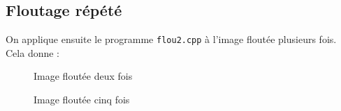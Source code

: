 \documentclass[french,a4paper,10pt]{article}
\begin{document}
    \newpage
    \subsection{Floutage répété}\label{subsec:4.2}

    On applique ensuite le programme \texttt{flou2.cpp} à l'image floutée plusieurs fois.
    Cela donne :
    \begin{figure}[!htb]
        \begin{minipage}{0.48\textwidth}
            \centering
            \caption{Image floutée deux fois}\label{Fig:peppers-grey-ff2-2}
        \end{minipage}\hfill
        \begin{minipage}{0.48\textwidth}
            \centering
            \caption{Image floutée cinq fois}\label{Fig:peppers-grey-ff2-5}
        \end{minipage}
    \end{figure}
\end{document}
